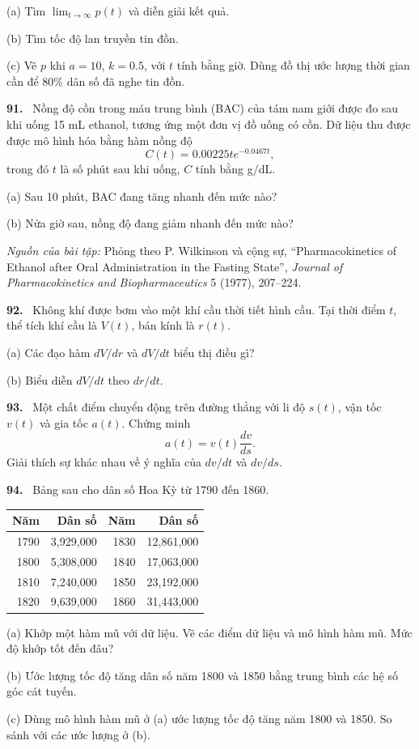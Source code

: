 \documentclass[12pt,a4paper]{article}
\newcommand{\bt}[1]{\par\smallskip\noindent\textbf{#1.}\ }
\begin{document}
(a) Tìm $\lim_{t\to\infty}p(t)$ và diễn giải kết quả.

(b) Tìm tốc độ lan truyền tin đồn.

(c) Vẽ $p$ khi $a=10$, $k=0.5$, với $t$ tính bằng giờ. Dùng đồ thị ước lượng thời gian cần để 80\% dân số đã nghe tin đồn.
\bt{91} Nồng độ cồn trong máu trung bình (BAC) của tám nam giới được đo sau khi uống 15 mL ethanol, tương ứng một đơn vị đồ uống có cồn. Dữ liệu thu được được mô hình hóa bằng hàm nồng độ
\[C(t)=0.00225te^{-0.0467t},\]
trong đó $t$ là số phút sau khi uống, $C$ tính bằng g/dL.

(a) Sau 10 phút, BAC đang tăng nhanh đến mức nào?

(b) Nửa giờ sau, nồng độ đang giảm nhanh đến mức nào?

\noindent\textit{Nguồn của bài tập:} Phỏng theo P. Wilkinson và cộng sự, “Pharmacokinetics of Ethanol after Oral Administration in the Fasting State”, \textit{Journal of Pharmacokinetics and Biopharmaceutics} 5 (1977), 207–224.
\bt{92} Không khí được bơm vào một khí cầu thời tiết hình cầu. Tại thời điểm $t$, thể tích khí cầu là $V(t)$, bán kính là $r(t)$.

(a) Các đạo hàm $dV/dr$ và $dV/dt$ biểu thị điều gì?

(b) Biểu diễn $dV/dt$ theo $dr/dt$.
\bt{93} Một chất điểm chuyển động trên đường thẳng với li độ $s(t)$, vận tốc $v(t)$ và gia tốc $a(t)$. Chứng minh
\[a(t)=v(t)\frac{dv}{ds}.\]
Giải thích sự khác nhau về ý nghĩa của $dv/dt$ và $dv/ds$.
\bt{94} Bảng sau cho dân số Hoa Kỳ từ 1790 đến 1860.
\begin{center}\begin{tabular}{rrrr}\toprule
Năm&Dân số&Năm&Dân số\\\midrule
1790&3,929,000&1830&12,861,000\\
1800&5,308,000&1840&17,063,000\\
1810&7,240,000&1850&23,192,000\\
1820&9,639,000&1860&31,443,000\\\bottomrule
\end{tabular}\end{center}
(a) Khớp một hàm mũ với dữ liệu. Vẽ các điểm dữ liệu và mô hình hàm mũ. Mức độ khớp tốt đến đâu?

(b) Ước lượng tốc độ tăng dân số năm 1800 và 1850 bằng trung bình các hệ số góc cát tuyến.

(c) Dùng mô hình hàm mũ ở (a) ước lượng tốc độ tăng năm 1800 và 1850. So sánh với các ước lượng ở (b).
\end{document}

